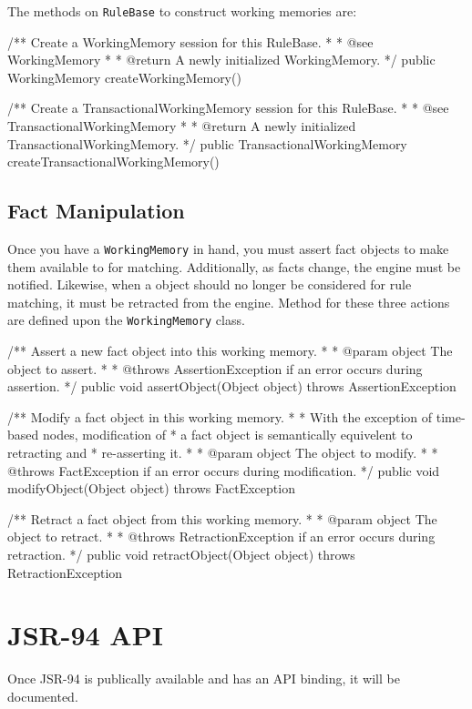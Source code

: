 The methods on \verb|RuleBase| to construct working memories are:

\bigskip

\begin{codelisting}    
/** Create a WorkingMemory session for this RuleBase.
 *
 *  @see WorkingMemory
 *
 *  @return A newly initialized WorkingMemory.
 */
public WorkingMemory createWorkingMemory() 

/** Create a TransactionalWorkingMemory session for this RuleBase.
 *
 *  @see TransactionalWorkingMemory
 *
 *  @return A newly initialized TransactionalWorkingMemory.
 */
public TransactionalWorkingMemory createTransactionalWorkingMemory()
\end{codelisting}

\subsection{Fact Manipulation}

Once you have a \verb|WorkingMemory| in hand, you must assert fact
objects to make them available to \drools{} for matching.  Additionally, as facts
change, the engine must be notified.  Likewise, when a object should
no longer be considered for rule matching, it must be retracted from
the engine.  Method for these three actions are defined upon the
\verb|WorkingMemory| class.

\bigskip

\begin{codelisting}
/** Assert a new fact object into this working memory.
*
*  @param object The object to assert.
*
*  @throws AssertionException if an error occurs during assertion.
*/
public void assertObject(Object object) throws AssertionException

/** Modify a fact object in this working memory.
*
*  With the exception of time-based nodes, modification of
*  a fact object is semantically equivelent to retracting and
*  re-asserting it.
*
*  @param object The object to modify.
*
*  @throws FactException if an error occurs during modification.
*/
public void modifyObject(Object object) throws FactException

/** Retract a fact object from this working memory.
*
*  @param object The object to retract.
*
*  @throws RetractionException if an error occurs during retraction.
*/
public void retractObject(Object object) throws RetractionException
\end{codelisting}

\section{JSR-94 API}

Once JSR-94 is publically available and \drools{} has an API
binding, it will be documented.

